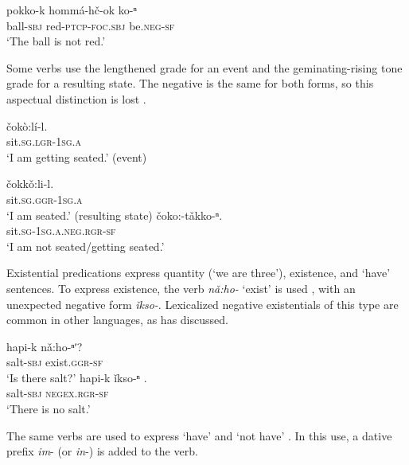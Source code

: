 \documentclass[output=paper,colorlinks,citecolor=brown]{langscibook}
\begin{document}
    \ex\label{ex:koa:25b}
        \gll pokko-k  hommá-hč-ok  ko-ⁿ \\
             ball-\textsc{sbj}  red-\textsc{ptcp}-\textsc{foc}.\textsc{sbj}  be.\textsc{neg}-\textsc{sf} \\
        \glt ‘The ball is not red.’
    \z
\z 

Some verbs use the lengthened grade for an event and the geminating-rising tone grade for a resulting state. The negative is the same for both forms, so this aspectual distinction is lost .



\ea\label{ex:koa:26}
    \ea\label{ex:koa:26a}
        \gll čokò:lí-l. \\ 
             sit.\textsc{sg.lgr}-1\textsc{sg.a} \\
        \glt ‘I am getting seated.’ (event)
    
    \ex\label{ex:koa:26b}
        \gll čokk\v{o}:li-l. \\
             sit.\textsc{sg.ggr}-1\textsc{sg.a}\\
        \glt ‘I am seated.’ (resulting state)
    \ex\label{ex:koa:26c}
        \gll čoko:-t\v{a}kko-ⁿ. \\
             sit.\textsc{sg}-1\textsc{sg.a.neg.rgr-sf} \\
        \glt ‘I am not seated/getting seated.’
    \z
\z  


Existential predications express quantity (‘we are three’), existence, and ‘have’ sentences. To express existence, the verb \textit{nǎ:ho-} ‘exist’ is used , with an unexpected negative form \textit{ǐkso-}. Lexicalized negative existentials of this type are common in other languages, as \citet{Veselinova2013neg.exist} has discussed.


\ea\label{ex:koa:27}
    \begin{xlist}[A: ]
    \label{ex:koa:27a}
        \gll hapi-k  nǎ:ho-ⁿʹ? \\ 
             salt-\textsc{sbj}  exist.\textsc{ggr}-\textsc{sf} \\
        \glt ‘Is there salt?’
    \label{ex:koa:27b}
        \gll hapi-k  ǐkso-ⁿ .\\
             salt-\textsc{sbj}  \textsc{negex}.\textsc{rgr}-\textsc{sf} \\
        \glt ‘There is no salt.’
    \end{xlist}
\z

The same verbs are used to express ‘have’ and ‘not have’ . In this use, a dative prefix \textit{im}- (or \textit{in}-) is added to the verb.
\end{document}
